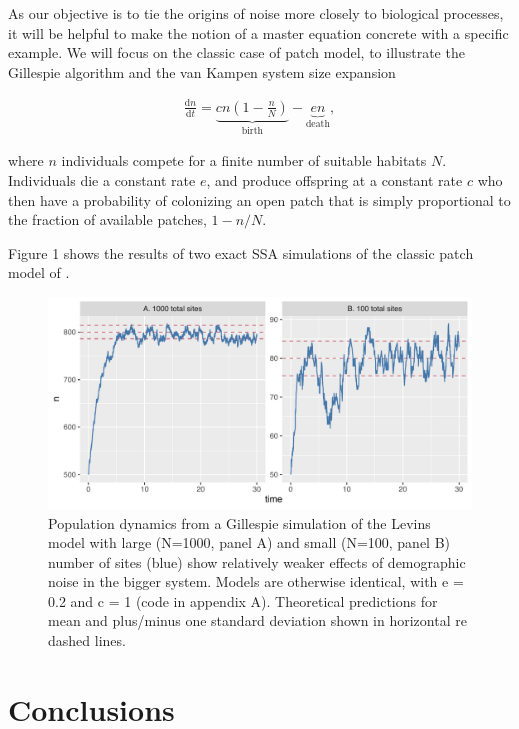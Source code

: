 \documentclass[preprint, 3p,
authoryear]{elsarticle} %
\begin{document}
As our objective is to tie the origins of noise more closely to
biological processes, it will be helpful to make the notion of a master
equation concrete with a specific example. We will focus on the classic
case of \citet{Levins1969} patch model, to illustrate the Gillespie
algorithm and the van Kampen system size expansion

\begin{align}
\frac{\mathrm{d} n}{\mathrm{d} t} = \underbrace{c n \left(1 - \frac{n}{N}\right)}_{\textrm{birth}} - \underbrace{e n}_{\textrm{death}}, \label{levins}
\end{align}

where \(n\) individuals compete for a finite number of suitable habitats
\(N\). Individuals die a constant rate \(e\), and produce offspring at a
constant rate \(c\) who then have a probability of colonizing an open
patch that is simply proportional to the fraction of available patches,
\(1 - n/N\).

Figure 1 shows the results of two exact SSA simulations of the classic
patch model of \citet{Levins1969}.

\begin{figure}
\centering
\includegraphics{paper_files/figure-latex/figure1-1.pdf}
\caption{Population dynamics from a Gillespie simulation of the Levins
model with large (N=1000, panel A) and small (N=100, panel B) number of
sites (blue) show relatively weaker effects of demographic noise in the
bigger system. Models are otherwise identical, with e = 0.2 and c = 1
(code in appendix A). Theoretical predictions for mean and plus/minus
one standard deviation shown in horizontal re dashed lines.}
\end{figure}

\hypertarget{conclusions}{%
\section{Conclusions}\label{conclusions}}
\end{document}
